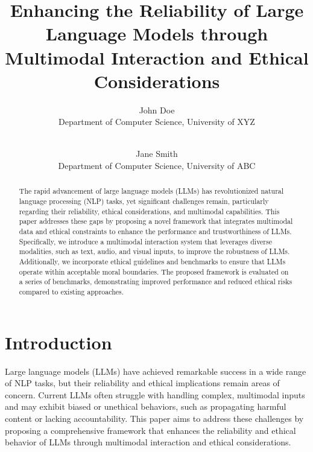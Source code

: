 \documentclass[11pt]{article}
\title{Enhancing the Reliability of Large Language Models through Multimodal Interaction and Ethical Considerations}
\author{
    John Doe \\
    Department of Computer Science, University of XYZ \\
    \email{john.doe@xyz.edu} \\
    \and
    Jane Smith \\
    Department of Computer Science, University of ABC \\
    \email{jane.smith@abc.edu}
}
\date{}
\begin{document}
\maketitle

\begin{abstract}
The rapid advancement of large language models (LLMs) has revolutionized natural language processing (NLP) tasks, yet significant challenges remain, particularly regarding their reliability, ethical considerations, and multimodal capabilities. This paper addresses these gaps by proposing a novel framework that integrates multimodal data and ethical constraints to enhance the performance and trustworthiness of LLMs. Specifically, we introduce a multimodal interaction system that leverages diverse modalities, such as text, audio, and visual inputs, to improve the robustness of LLMs. Additionally, we incorporate ethical guidelines and benchmarks to ensure that LLMs operate within acceptable moral boundaries. The proposed framework is evaluated on a series of benchmarks, demonstrating improved performance and reduced ethical risks compared to existing approaches.
\end{abstract}

\section{Introduction}
Large language models (LLMs) have achieved remarkable success in a wide range of NLP tasks, but their reliability and ethical implications remain areas of concern. Current LLMs often struggle with handling complex, multimodal inputs and may exhibit biased or unethical behaviors, such as propagating harmful content or lacking accountability. This paper aims to address these challenges by proposing a comprehensive framework that enhances the reliability and ethical behavior of LLMs through multimodal interaction and ethical considerations.
\end{document}
